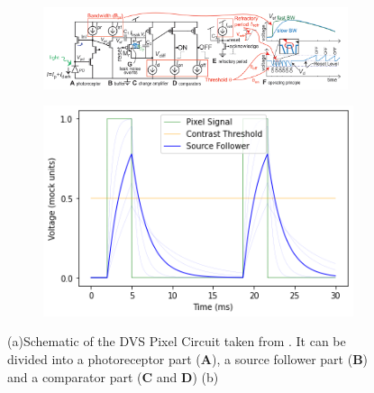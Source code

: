 
\begin{figure}
  \begin{subfigure}{0.5\textwidth}
    \includegraphics[height=2.4cm]{resources/images/intensity-estimation/DVSCircuit.png}
    \caption{}
    \label{fig:image1}
  \end{subfigure}
  \begin{subfigure}{0.5\textwidth}
    \centering
    \includegraphics[width=0.7\linewidth]{resources/plots/intensity-estimation/source_follower.png}
    \caption{}
    \label{fig:image2}
  \end{subfigure}
  \caption{(a)Schematic of the DVS Pixel Circuit taken from \cite{DVSBiases2023}. It can be divided into a photoreceptor part (\textbf{A}), a source follower part (\textbf{B}) and a comparator part (\textbf{C} and \textbf{D})
  (b) }
  \label{fig:whole_figure}
\end{figure}